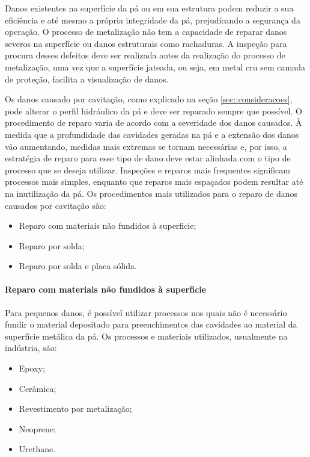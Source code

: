 Danos existentes na superfície da pá ou em sua estrutura podem reduzir a sua
eficiência e até mesmo a própria integridade da pá, prejudicando a segurança 
da operação. O processo de metalização não tem a capacidade de reparar
danos severos na superfície ou danos estruturais como rachaduras. A inspeção
para procura desses defeitos deve ser realizada antes da realização do processo
de metalização, uma vez que a superfície jateada, ou seja, em metal cru sem
camada de proteção, facilita a visualização de danos. %

Os danos causado por cavitação, como explicado na seção
\ref{sec::consideracoes}, pode alterar o perfil hidráulico da pá e deve ser
reparado sempre que possível. O procedimento de reparo varia de acordo com a
severidade dos danos causados. À medida que a profundidade das cavidades geradas
na pá e a extensão dos danos vão aumentando, medidas mais extremas se tornam
necessárias e, por isso, a estratégia de reparo para esse tipo de dano deve
estar alinhada com o tipo de processo que se deseja utilizar. Inspeções e
reparos mais frequentes significam processos mais simples, enquanto que reparos
mais espaçados podem resultar até na inutilização da pá. Os procedimentos mais
utilizados para o reparo de danos causados por cavitação são:

\begin{itemize}
  \item Reparo com materiais não fundidos à superficie;
  \item Reparo por solda;
  \item Reparo por solda e placa sólida.
\end{itemize}

\paragraph{Reparo com materiais não fundidos à superficie}

Para pequenos danos, é possível utilizar processos nos quais não é necessário
fundir o material depositado para preenchimentos das cavidades ao material da
superfície metálica da pá. Os processos e materiais utilizados, usualmente na
indústria, são: 

\begin{itemize}
\item Epoxy;
\item Cerâmica;
\item Revestimento por metalização;
\item Neoprene;
\item Urethane.
\end{itemize}

